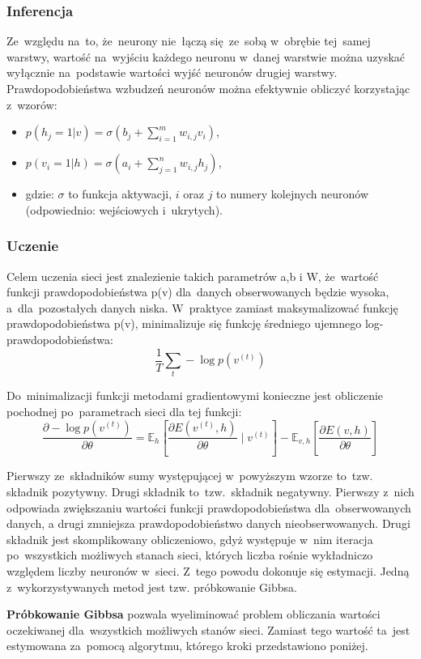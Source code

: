 \subsubsection{Inferencja}
Ze~względu na~to, że~neurony nie~łączą się~ze~sobą w~obrębie tej~samej warstwy, wartość na~wyjściu każdego
neuronu w~danej warstwie można uzyskać wyłącznie na~podstawie wartości wyjść neuronów drugiej warstwy.
Prawdopodobieństwa wzbudzeń neuronów można efektywnie obliczyć korzystając z~wzorów:
\begin{itemize}
	\item $p(h_{j}=1|v)=\sigma(b_{j}+\sum\limits_{i=1}^{m}w_{i,j}v_{i})$,
	\item $p(v_{i}=1|h)=\sigma(a_{i}+\sum\limits_{j=1}^{n}w_{i,j}h_{j})$,
	\item gdzie: $\sigma$ to funkcja aktywacji, $i$ oraz $j$ to numery kolejnych neuronów (odpowiednio:
	wejściowych i~ukrytych).
\end{itemize}

\subsubsection{Uczenie}
Celem uczenia sieci jest znalezienie takich parametrów a,b i W, że~wartość funkcji prawdopodobieństwa p(v)
dla~danych obserwowanych będzie wysoka, a~dla~pozostałych danych niska. W~praktyce zamiast maksymalizować
funkcję prawdopodobieństwa p(v), minimalizuje się funkcję średniego ujemnego log-prawdopodobieństwa:
$$\frac{1}{T}\sum\limits_{t}-\log{p(v^{(t)})}$$

Do~minimalizacji funkcji metodami gradientowymi konieczne jest obliczenie pochodnej po~parametrach sieci
dla tej funkcji:
$$\frac{\partial-\log{p(v^{(t)})}}{\partial{\theta}}=\mathbb{E}_h[\frac{\partial{E(v^{(t)},h)}}{\partial{\theta}}\mid{v^{(t)}}]-\mathbb{E}_{v,h}[\frac{\partial{E(v,h)}}{\partial{\theta}}]$$

Pierwszy ze~składników sumy występującej w~powyższym wzorze to~tzw. składnik pozytywny. Drugi składnik
to~tzw.~składnik negatywny. Pierwszy z~nich odpowiada zwiększaniu wartości funkcji prawdopodobieństwa
dla~obserwowanych danych, a drugi zmniejsza prawdopodobieństwo danych nieobserwowanych. Drugi składnik jest
skomplikowany obliczeniowo, gdyż występuje w~nim iteracja po~wszystkich możliwych stanach sieci, których
liczba rośnie wykładniczo względem liczby neuronów w~sieci. Z~tego powodu dokonuje się estymacji. Jedną
z~wykorzystywanych metod jest tzw. próbkowanie Gibbsa. 

\textbf{Próbkowanie Gibbsa} pozwala wyeliminować problem obliczania wartości oczekiwanej dla~wszystkich
możliwych stanów sieci. Zamiast tego wartość ta~jest estymowana za~pomocą algorytmu, którego kroki
przedstawiono poniżej.

